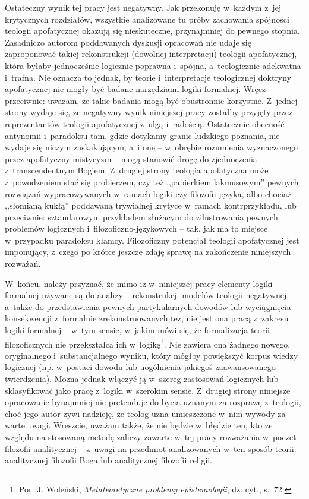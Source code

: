 Ostateczny wynik tej pracy jest negatywny. Jak przekonuję w~każdym z~jej krytycznych rozdziałów, wszystkie analizowane tu próby zachowania spójności teologii apofatycznej okazują się nieskuteczne, przynajmniej do pewnego stopnia. Zasadniczo autorom poddawanych dyskusji opracowań nie udaje się zaproponować takiej rekonstrukcji (dowolnej interpretacji) teologii apofatycznej, która byłaby jednocześnie logicznie poprawna i~spójna, a~teologicznie adekwatna i~trafna. Nie oznacza to jednak, by teorie i~interpretacje teologicznej doktryny apofatycznej nie mogły być badane narzędziami logiki formalnej. Wręcz przeciwnie: uważam, że takie badania mogą być obustronnie korzystne. Z~jednej strony wydaje się, że negatywny wynik niniejszej pracy zostałby przyjęty przez reprezentantów teologii apofatycznej z~ulgą i~radością. Ostatecznie obecność antynomii i~paradoksu tam, gdzie dotykamy granic ludzkiego poznania, nie wydaje się niczym zaskakującym, a~i one -- w~obrębie rozumienia wyznaczonego przez apofatyczny mistycyzm -- mogą stanowić drogę do zjednoczenia z~transcendentnym Bogiem. Z~drugiej strony teologia apofatyczna może z~powodzeniem stać się probierzem, czy też ,,papierkiem lakmusowym'' pewnych rozwiązań wypracowywanych w~ramach logiki czy filozofii języka, albo chociaż ,,słomianą kukłą'' poddawaną trywialnej krytyce w~ramach kontrprzykładu, lub przeciwnie: sztandarowym przykładem służącym do zilustrowania pewnych problemów logicznych i~filozoficzno-językowych -- tak, jak ma to miejsce w~przypadku paradoksu kłamcy. Filozoficzny potencjał teologii apofatycznej jest imponujący, z~czego po krótce jeszcze zdaję sprawę na zakończenie niniejszych rozważań.

W~końcu, należy przyznać, że mimo iż w~niniejszej pracy elementy logiki formalnej używane są do analizy i~rekonstrukcji modelów teologii negatywnej, a~także do przedstawienia pewnych partykularnych dowodów lub wyciągnięcia konsekwencji z~formalnie zrekonstruowanych tez, nie jest ona pracą z~zakresu logiki formalnej -- w~tym sensie, w~jakim mówi się, że formalizacja teorii filozoficznych nie przekształca ich w~logikę\footnote{Por. J. Woleński, \textit{Metateoretyczne problemy epistemologii}, dz. cyt., s.~72.}. Nie zawiera ona żadnego nowego, oryginalnego i~substancjalnego wyniku, który mógłby powiększyć korpus wiedzy logicznej (np. w~postaci dowodu lub uogólnienia jakiegoś zaawansowanego twierdzenia). Można jednak włączyć ją w~szereg zastosowań logicznych lub sklasyfikować jako pracę z~logiki w~szerokim sensie. Z~drugiej strony niniejsze opracowanie bynajmniej nie pretenduje  do bycia uznanym za rozprawę z~teologii, choć jego autor żywi nadzieję, że teolog uzna umieszczone w~nim wywody za warte uwagi. Wreszcie, uważam także, że nie będzie w~błędzie ten, kto ze względu na stosowaną metodę zaliczy zawarte w~tej pracy rozważania w~poczet filozofii analitycznej -- z~uwagi na przedmiot analizowanych w~ten sposób teorii: analitycznej filozofii Boga lub analitycznej filozofii religii.



